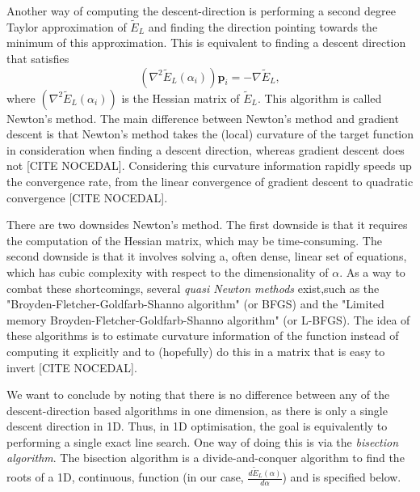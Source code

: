 \documentclass[11pt,a4paper]{article}
\numberwithin{equation}{section}
\begin{document}
Another way of computing the descent-direction is performing a second degree Taylor approximation of $\tilde{E}_L$ and finding the direction pointing towards the minimum of this approximation. This is equivalent to finding a descent direction that satisfies
\begin{equation}
    (\nabla^2 \tilde{E}_L(\alpha_i))\bm{p}_i = -\nabla \tilde{E}_L,
\end{equation}
where $(\nabla^2 \tilde{E}_L(\alpha_i))$ is the Hessian matrix of $\tilde{E}_L$. This algorithm is called Newton's method. The main difference between Newton's method and gradient descent is that Newton's method takes the (local) curvature of the target function in consideration when finding a descent direction, whereas gradient descent does not [CITE NOCEDAL]. Considering this curvature information rapidly speeds up the convergence rate, from the linear convergence of gradient descent to quadratic convergence [CITE NOCEDAL].

There are two downsides Newton's method. The first downside is that it requires the computation of the Hessian matrix, which may be time-consuming. The second downside is that it involves solving a, often dense, linear set of equations, which has cubic complexity with respect to the dimensionality of $\alpha$. As a way to combat these shortcomings, several \emph{quasi Newton methods} exist,such as the "Broyden-Fletcher-Goldfarb-Shanno algorithm" (or BFGS) and the "Limited memory Broyden-Fletcher-Goldfarb-Shanno algorithm" (or L-BFGS). The idea of these algorithms is to estimate curvature information of the function instead of computing it explicitly and to (hopefully) do this in a matrix that is easy to invert [CITE NOCEDAL].

We want to conclude by noting that there is no difference between any of the descent-direction based algorithms in one dimension, as there is only a single descent direction in 1D. Thus, in 1D optimisation, the goal is equivalently to performing a single exact line search. One way of doing this is via the \emph{bisection algorithm}. The bisection algorithm is a divide-and-conquer algorithm to find the roots of a 1D, continuous, function (in our case, $\frac{d\tilde{E}_L(\alpha)}{d\alpha}$) and is specified below.
\end{document}
